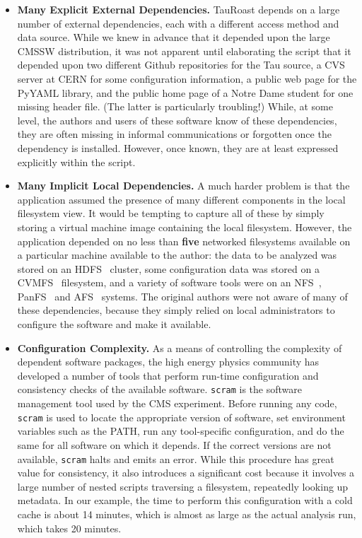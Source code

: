 \documentclass{sig-alternate}
\begin{document}
\begin{itemize}

\item {\bf Many Explicit External Dependencies.}  TauRoast depends on a large number of
external dependencies, each with a different access method and data source.
While we knew in advance that it depended upon the large CMSSW distribution,
it was not apparent until elaborating the script that it depended upon
two different Github repositories for the Tau source,
a CVS server at CERN for some configuration information, a public web page
for the PyYAML library, and the public home page of a Notre Dame student
for one missing header file.  (The latter is particularly troubling!)
While, at some level, the authors and users of these software know of these dependencies, they are often missing in
informal communications or forgotten once the dependency is installed.
However, once known, they are at least expressed explicitly within the script.

\item {\bf Many Implicit Local Dependencies.} A much harder problem is that the
application assumed the presence of many different components in the local
filesystem view. It would be tempting to capture all of these by simply
storing a virtual machine image containing the local filesystem. However,
the application depended on no less than {\bf five} networked filesystems
available on a particular machine available to the author:
the data to be analyzed was stored on an HDFS~\cite{borthakur2008hdfs} cluster,
some configuration data was stored on a CVMFS~\cite{blomer2011cernvm} filesystem,
and a variety of software tools were on an NFS~\cite{howard1988scale},
PanFS~\cite{welch2008scalable} and AFS~\cite{sandberg1985design} systems.
The original authors were not aware of many of these dependencies,
because they simply relied on local administrators to configure the
software and make it available.

\item {\bf Configuration Complexity.}  As a means of controlling the complexity
of dependent software packages, the high energy physics community has developed
a number of tools that perform run-time configuration and consistency checks
of the available software.  {\tt scram} is the software management tool used
by the CMS experiment.  Before running any code, {\tt scram} is used to locate
the appropriate version of software,  set environment variables such as the PATH, run any
tool-specific configuration, and do the same for all software on which it depends.
If the correct versions are not available, {\tt scram} halts and emits an error.
While this procedure has great value for consistency, it also introduces a significant cost
because it involves a large number of nested scripts traversing a filesystem,
repeatedly looking up metadata.  In our example, the time to perform this configuration
with a cold cache is about 14 minutes, which is almost as large as the actual analysis
run, which takes 20 minutes.


\end{itemize}
\end{document}
